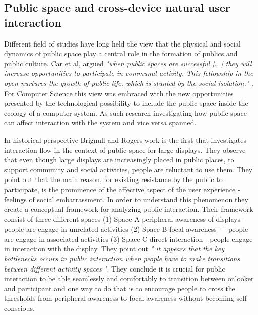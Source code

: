 \subsection{Public space and cross-device natural user interaction}
Different field of studies have long held the view that the physical and social dynamics of public space play a central role in the formation of publics and public culture. Car et al, argued \emph{"when public spaces are successful [...] they will increase opportunities to participate in communal activity. This fellowship in the open nurtures the growth of public life, which is stunted by the social isolation."} \cite{carr:1992}. For Computer Science this view was embraced with the new opportunities presented by the technological possibility to include the public space inside the ecology of a computer system. As such research investigating how public space can affect interaction with the system and vice versa spanned.

In historical perspective Brignull and Rogers work\cite{Brignull:2003} is the first that investigates interaction flow in the context of public space for large displays. They observe that even though large displays are increasingly placed in public places, to support community and social activities, people are reluctant to use them. They point out that the main reason, for existing resistance by the public to participate, is the prominence of the affective aspect of the  user experience - feelings of social embarrassment. In order to understand this phenomenon they create a conceptual framework for analyzing public interaction. Their framework consist of three different spaces (1) Space A peripheral awareness of displays - people are engage in unrelated activities (2) Space B focal awareness - - people are engage in associated activities (3) Space C direct interaction - people engage in interaction with the display. They point out \emph{" it appears that the key bottlenecks occurs in public interaction when people have to make transitions between different activity spaces "}. They conclude  it is crucial for public interaction to be able seamlessly and comfortably to transition between onlooker and participant and one way to do that is to encourage people to cross the thresholds from peripheral awareness to focal awareness without becoming self-conscious.

